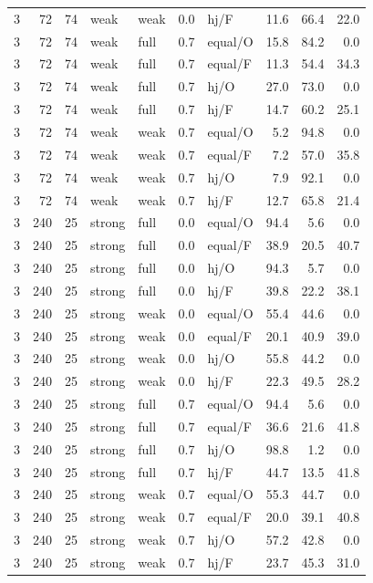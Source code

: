 {\begin{longtable}{@{}rrrllllrrr@{}}
3 & 72 & 74 & weak & weak & 0.0 & hj/F & 11.6 & 66.4 & 22.0\\
3 & 72 & 74 & weak & full & 0.7 & equal/O & 15.8 & 84.2 & 0.0\\
3 & 72 & 74 & weak & full & 0.7 & equal/F & 11.3 & 54.4 & 34.3\\
3 & 72 & 74 & weak & full & 0.7 & hj/O & 27.0 & 73.0 & 0.0\\
3 & 72 & 74 & weak & full & 0.7 & hj/F & 14.7 & 60.2 & 25.1\\
3 & 72 & 74 & weak & weak & 0.7 & equal/O & 5.2 & 94.8 & 0.0\\
3 & 72 & 74 & weak & weak & 0.7 & equal/F & 7.2 & 57.0 & 35.8\\
3 & 72 & 74 & weak & weak & 0.7 & hj/O & 7.9 & 92.1 & 0.0\\
3 & 72 & 74 & weak & weak & 0.7 & hj/F & 12.7 & 65.8 & 21.4\\
3 & 240 & 25 & strong & full & 0.0 & equal/O & 94.4 & 5.6 & 0.0\\
3 & 240 & 25 & strong & full & 0.0 & equal/F & 38.9 & 20.5 & 40.7\\
3 & 240 & 25 & strong & full & 0.0 & hj/O & 94.3 & 5.7 & 0.0\\
3 & 240 & 25 & strong & full & 0.0 & hj/F & 39.8 & 22.2 & 38.1\\
3 & 240 & 25 & strong & weak & 0.0 & equal/O & 55.4 & 44.6 & 0.0\\
3 & 240 & 25 & strong & weak & 0.0 & equal/F & 20.1 & 40.9 & 39.0\\
3 & 240 & 25 & strong & weak & 0.0 & hj/O & 55.8 & 44.2 & 0.0\\
3 & 240 & 25 & strong & weak & 0.0 & hj/F & 22.3 & 49.5 & 28.2\\
3 & 240 & 25 & strong & full & 0.7 & equal/O & 94.4 & 5.6 & 0.0\\
3 & 240 & 25 & strong & full & 0.7 & equal/F & 36.6 & 21.6 & 41.8\\
3 & 240 & 25 & strong & full & 0.7 & hj/O & 98.8 & 1.2 & 0.0\\
3 & 240 & 25 & strong & full & 0.7 & hj/F & 44.7 & 13.5 & 41.8\\
3 & 240 & 25 & strong & weak & 0.7 & equal/O & 55.3 & 44.7 & 0.0\\
3 & 240 & 25 & strong & weak & 0.7 & equal/F & 20.0 & 39.1 & 40.8\\
3 & 240 & 25 & strong & weak & 0.7 & hj/O & 57.2 & 42.8 & 0.0\\
3 & 240 & 25 & strong & weak & 0.7 & hj/F & 23.7 & 45.3 & 31.0\\

\end{longtable}}
